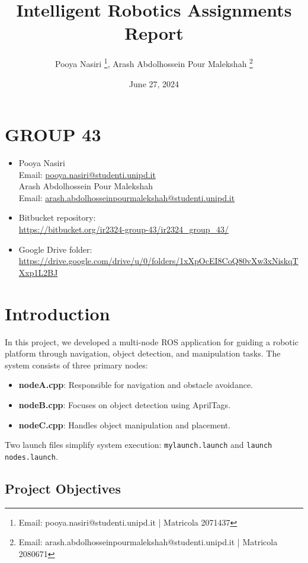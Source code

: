 \documentclass[a4paper]{article}
\title{Intelligent Robotics Assignments Report}
\author{Pooya Nasiri \thanks{Email: pooya.nasiri@studenti.unipd.it | Matricola 2071437},  
Arash Abdolhossein Pour Malekshah \thanks{Email: arash.abdolhosseinpourmalekshah@studenti.unipd.it | Matricola 2080671}}
\date{June 27, 2024}
\begin{document}
\maketitle

\section*{GROUP 43}
\begin{itemize}
    \item Pooya Nasiri \\
    Email: \href{mailto:pooya.nasiri@studenti.unipd.it}{pooya.nasiri@studenti.unipd.it} \\
    Arash Abdolhossein Pour Malekshah \\
    Email: \href{mailto:arash.abdolhosseinpourmalekshah@studenti.unipd.it}{arash.abdolhosseinpourmalekshah@studenti.unipd.it}
    
    \item Bitbucket repository: \\
    \url{https://bitbucket.org/ir2324-group-43/ir2324_group_43/}
    \item Google Drive folder: \\
    \url{https://drive.google.com/drive/u/0/folders/1xXpOcEI8CoQ80vXw3xNiskqTXxp1L2BJ}
\end{itemize}
\section{Introduction}

In this project, we developed a multi-node ROS application for guiding a robotic platform through navigation, object detection, and manipulation tasks. The system consists of three primary nodes:

\begin{itemize}
    \item \textbf{nodeA.cpp}: Responsible for navigation and obstacle avoidance.
    \item \textbf{nodeB.cpp}: Focuses on object detection using AprilTags.
    \item \textbf{nodeC.cpp}: Handles object manipulation and placement.
\end{itemize}

Two launch files simplify system execution: \texttt{mylaunch.launch} and \texttt{launch nodes.launch}.

\subsection{Project Objectives}
\end{document}
